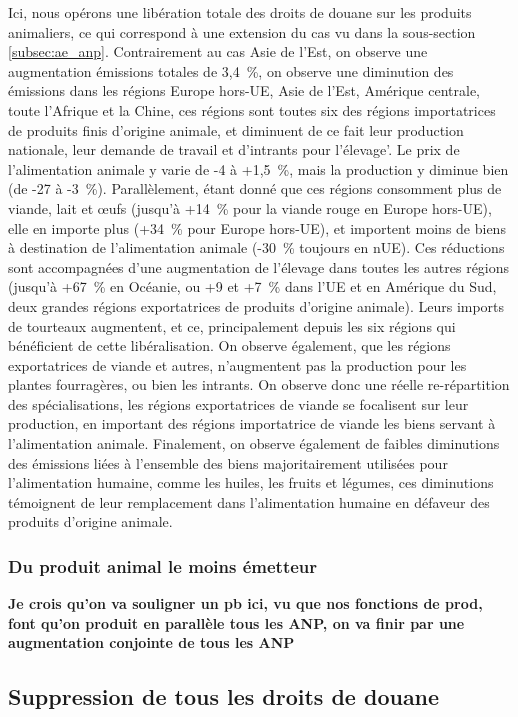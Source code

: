 Ici, nous opérons une libération totale des droits de douane sur les produits animaliers, ce qui correspond à une extension du cas vu dans la sous-section \ref{subsec:ae_anp}. Contrairement au cas Asie de l'Est, on observe une augmentation émissions totales de 3,4~\%, on observe une diminution des émissions dans les régions Europe hors-UE, Asie de l'Est, Amérique centrale, toute l'Afrique et la Chine, ces régions sont toutes six des régions importatrices de produits finis d'origine animale, et diminuent de ce fait leur production nationale, leur demande de travail et d'intrants pour l'élevage'. Le prix de l'alimentation animale y varie de -4 à +1,5~\%, mais la production y diminue bien (de -27 à -3~\%). Parallèlement, étant donné que ces régions consomment plus de viande, lait et œufs (jusqu'à +14~\% pour la viande rouge en Europe hors-UE), elle en importe plus (+34~\% pour Europe hors-UE), et importent moins de biens à destination de l'alimentation animale (-30~\% toujours en nUE). Ces réductions sont accompagnées d'une augmentation de l'élevage dans toutes les autres régions (jusqu'à +67~\% en Océanie, ou +9 et +7~\% dans l'UE et en Amérique du Sud, deux grandes régions exportatrices de produits d'origine animale). Leurs imports de tourteaux augmentent, et ce, principalement depuis les six régions qui bénéficient de cette libéralisation. On observe également, que les régions exportatrices de viande et autres, n'augmentent pas la production pour les plantes fourragères, ou bien les intrants. On observe donc une réelle re-répartition des spécialisations, les régions exportatrices de viande se focalisent sur leur production, en important des régions importatrice de viande les biens servant à l'alimentation animale. Finalement, on observe également de faibles diminutions des émissions liées à l'ensemble des biens majoritairement utilisées pour l'alimentation humaine, comme les huiles, les fruits et légumes, ces diminutions témoignent de leur remplacement dans l'alimentation humaine en défaveur des produits d'origine animale.

\subsubsection{Du produit animal le moins émetteur}

\textbf{Je crois qu'on va souligner un pb ici, vu que nos fonctions de prod, font qu'on produit en parallèle tous les ANP, on va finir par une augmentation conjointe de tous les ANP}


\subsection{Suppression de tous les droits de douane}

